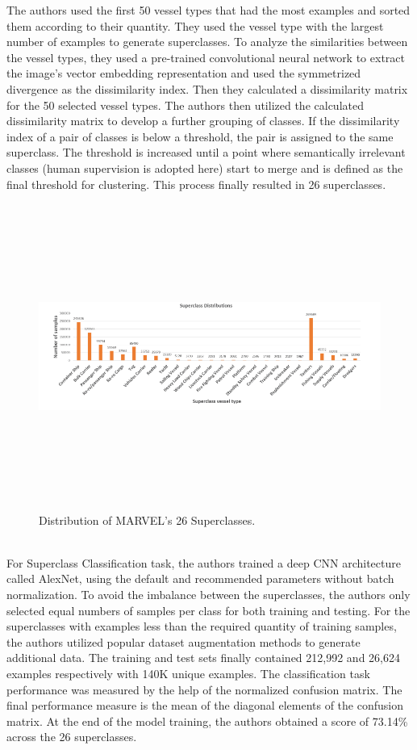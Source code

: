 The authors used the first 50 vessel types that had the most examples and sorted them according to their quantity. They used the vessel type with the largest number of examples to generate superclasses. To analyze the similarities between the vessel types, they used a pre-trained convolutional neural network to extract the image's vector embedding representation and used the symmetrized divergence as the dissimilarity index. Then they calculated a dissimilarity matrix for the 50 selected vessel types. The authors then utilized the calculated dissimilarity matrix to develop a further grouping of classes. If the dissimilarity index of a pair of classes is below a threshold, the pair is assigned to the same superclass. The threshold is increased until a point where semantically irrelevant classes (human supervision is adopted here) start to merge and is defined as the final threshold for clustering. This process finally resulted in 26 superclasses. 
\begin{figure}[H]
    \centering
    \includegraphics[width=\textwidth,height=10cm,keepaspectratio=true]{src/Images/marvel_superclasses.PNG}
    \caption{
     Distribution of MARVEL's 26 Superclasses\cite{gundogdu2017marvel}. 
     }
\end{figure}
\\

For Superclass Classification task, the authors trained a deep CNN architecture called AlexNet, using the default and recommended parameters without batch normalization. To avoid the imbalance between the superclasses, the authors only selected equal numbers of samples per class for both training and testing. For the superclasses with examples less than the required quantity of training samples, the authors utilized popular dataset augmentation methods to generate additional data. The training and test sets finally contained 212,992 and 26,624 examples respectively with 140K unique examples. The
classification task performance was measured by the help of the normalized confusion matrix. The final performance measure is the mean of the diagonal elements of the confusion matrix. At the end of the model training, the authors obtained a score of 73.14\% across the 26 superclasses. 
\\

